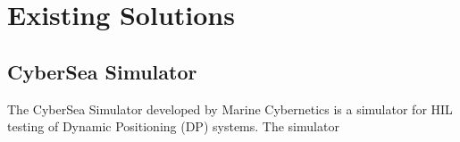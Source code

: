 \chapter{Existing Solutions}


\section{CyberSea Simulator}
The CyberSea Simulator developed by Marine Cybernetics is a simulator for HIL testing of Dynamic Positioning (DP) systems. The simulator 